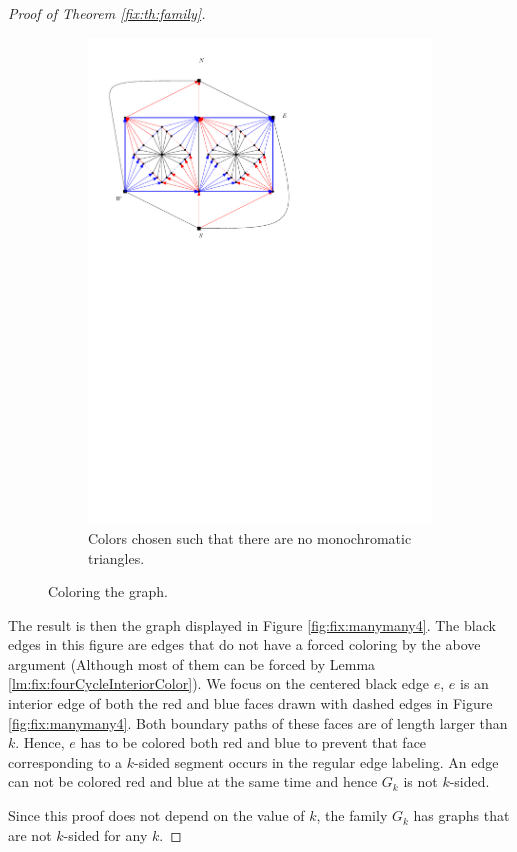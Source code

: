 \begin{proof}[Proof of Theorem \ref{fix:th:family}]
\begin{figure}[h]
\begin{subfigure}[t]{0.3\textwidth}
      \includegraphics[width=\textwidth]{fixExtension/img/manymany3}
      \caption{Colors chosen such that there are no monochromatic triangles.}
      \label{fig:fix:manymany3}
    \end{subfigure}
    \caption{Coloring the graph.}
    \label{fig:fix:coloring}
  \end{figure}

  The result is then the graph displayed in Figure \ref{fig:fix:manymany4}. The black edges in this figure are edges that do not have a forced coloring by the above argument (Although most of them can be forced by Lemma \ref{lm:fix:fourCycleInteriorColor}).
  We focus on the centered black edge $e$, $e$ is an interior edge of both the red and blue faces drawn with dashed edges in Figure \ref{fig:fix:manymany4}. Both boundary paths of these faces are of length larger than $k$. Hence, $e$ has to be colored both red and blue to prevent that face corresponding to a $k$-sided segment occurs in the regular edge labeling. An edge can not be colored red and blue at the same time and hence $G_k$ is not $k$-sided.

  Since this proof does not depend on the value of $k$, the family $G_k$ has graphs that are not $k$-sided for any $k$.
\end{proof}


